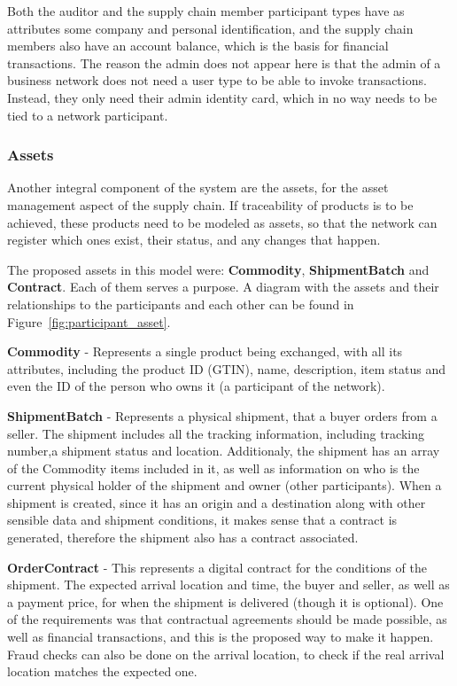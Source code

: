 Both the auditor and the supply chain member participant types have as attributes some company and personal identification, and the supply chain members also have an account balance, which is the basis for financial transactions.  The reason the admin does not appear here is that the admin of a business network does not need a user type to be able to invoke transactions. Instead, they only need their admin identity card, which in no way needs to be tied to a network participant.

\subsubsection*{Assets}%

Another integral component of the system are the assets, for the asset management aspect of the supply chain. If traceability of products is to be achieved, these products need to be modeled as assets, so that the network can register which ones exist, their status, and any changes that happen.

The proposed assets in this model were: \textbf{Commodity}, \textbf{ShipmentBatch} and \textbf{Contract}. Each of them serves a purpose. A diagram with the assets and their relationships to the participants and each other can be found in Figure~\ref{fig:participant_asset}.

\par \textbf{Commodity} - Represents a single product being exchanged, with all its attributes, including the product ID (GTIN), name, description, item status and even the ID of the person who owns it (a participant of the network).
\par \textbf{ShipmentBatch} - Represents a physical shipment, that a buyer orders from a seller. The shipment includes all the tracking information, including tracking number,a shipment status and location. Additionaly, the shipment  has an array of the Commodity items included in it, as well as information on who is the current physical holder of the shipment and owner (other participants). When a shipment is created, since it has an origin and a destination along with other sensible data and shipment conditions, it makes sense that a contract is generated, therefore the shipment also has a contract associated.
\par \textbf{OrderContract} - This represents a digital contract for the conditions of the shipment. The expected arrival location and time, the buyer and seller, as well as a payment price, for when the shipment is delivered (though it is optional). One of the requirements was that contractual agreements should be made possible, as well as financial transactions, and this is the proposed way to make it happen. Fraud checks can also be done on the arrival location, to check if the real arrival location matches the expected one.


